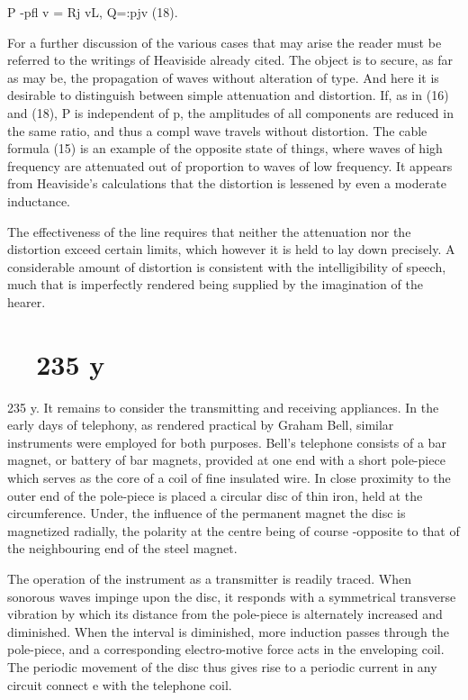P -pfl v = Rj vL, Q=:pjv (18).

For a further discussion of the various cases that may arise
the reader must be referred to the writings of Heaviside already
cited. The object is to secure, as far as may be, the propagation
of waves without alteration of type. And here it is desirable to
distinguish between simple attenuation and distortion. If, as in
(16) and (18), P is independent of p, the amplitudes of all components are
reduced in the same ratio, and thus a compl wave
travels without distortion. The cable formula (15) is an example
of the opposite state of things, where waves of high frequency are
attenuated out of proportion to waves of low frequency. It appears
from Heaviside’s calculations that the distortion is lessened by
even a moderate inductance.

The effectiveness of the line requires that neither the attenuation nor the
distortion exceed certain limits, which however it is
held to lay down precisely. A considerable amount of distortion
is consistent with the intelligibility of speech, much that is
imperfectly rendered being supplied by the imagination of the hearer.

\section{~~235 y}
235 y. It remains to consider the transmitting and receiving
appliances. In the early days of telephony, as rendered practical
by Graham Bell, similar instruments were employed for both
purposes. Bell’s telephone consists of a bar magnet, or battery
of bar magnets, provided at one end with a short pole-piece
which serves as the core of a coil of fine insulated wire. In close
proximity to the outer end of the pole-piece is placed a circular
disc of thin iron, held at the circumference. Under, the influence
of the permanent magnet the disc is magnetized radially, the
polarity at the centre being of course -opposite to that of the
neighbouring end of the steel magnet.

The operation of the instrument as a transmitter is readily
traced. When sonorous waves impinge upon the disc, it responds
with a symmetrical transverse vibration by which its distance
from the pole-piece is alternately increased and diminished.
When the interval is diminished, more induction passes through
the pole-piece, and a corresponding electro-motive force acts in
the enveloping coil. The periodic movement of the disc thus
gives rise to a periodic current in any circuit connect e  with the
telephone coil.

